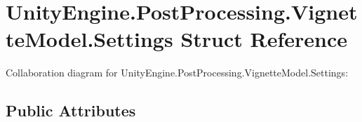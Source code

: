 \hypertarget{struct_unity_engine_1_1_post_processing_1_1_vignette_model_1_1_settings}{}\section{Unity\+Engine.\+Post\+Processing.\+Vignette\+Model.\+Settings Struct Reference}
\label{struct_unity_engine_1_1_post_processing_1_1_vignette_model_1_1_settings}


Collaboration diagram for Unity\+Engine.\+Post\+Processing.\+Vignette\+Model.\+Settings\+:
\subsection*{Public Attributes}

